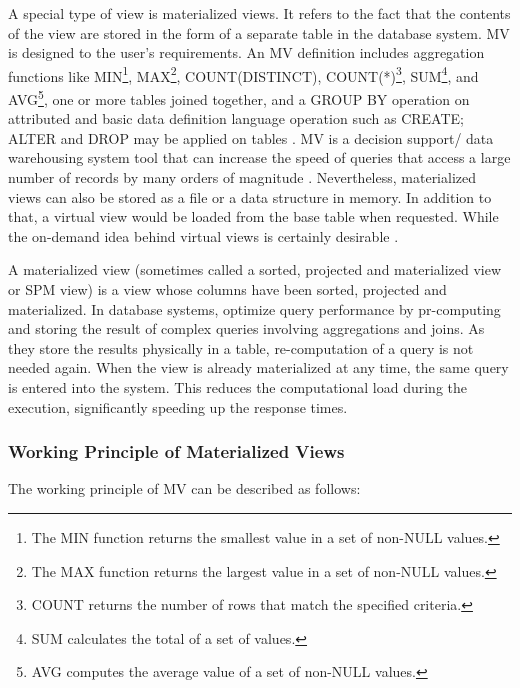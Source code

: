  A special type of view is materialized views. It refers to the fact that the contents of the view are stored in the form of a separate table in the database system. MV is designed to the user's requirements. An MV definition includes aggregation functions like MIN\footnote{The MIN function returns the smallest value in a set of non-NULL values.}, MAX\footnote{The MAX function returns the largest value in a set of non-NULL values.}, COUNT(DISTINCT), COUNT(*)\footnote{COUNT returns the number of rows that match the specified criteria.}, SUM\footnote{SUM calculates the total of a set of values.}, and AVG\footnote{AVG computes the average value of a set of non-NULL values.}, one or more tables joined together, and a GROUP BY operation on attributed and basic data definition language operation such as CREATE; ALTER and DROP may be applied on tables \cite{Kardel_Thakare}. MV is a decision support/ data warehousing system tool that can increase the speed of queries that access a large number of records by many orders of magnitude \cite{Kishan_Sainath_no_date}. Nevertheless, materialized views can also be stored as a file or a data structure in memory. In addition to that, a virtual view would be loaded from the base table when requested. While the on-demand idea behind virtual views is certainly desirable \cite{jan-no-date,ashadevi-2024}.\vspace{.4cm}



A materialized view (sometimes called a sorted, projected and materialized view or SPM view) is a view whose columns have been sorted, projected and materialized.\cite{IBM} In database systems, optimize query performance by pr-computing and storing the result of complex queries involving aggregations and joins. As they store the results physically in a table, re-computation of a query is not needed again. When the view is already materialized at any time, the same query is entered into the system. This reduces the computational load during the execution, significantly speeding up the response times.\vspace{.4cm}

\subsubsection{Working Principle of Materialized Views}
The working principle of MV can be described as follows:

